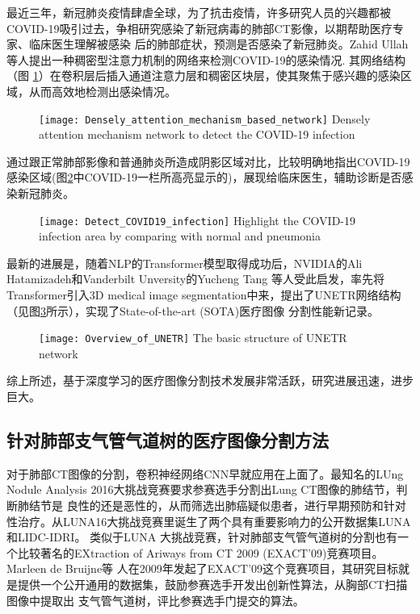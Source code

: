 	最近三年，新冠肺炎疫情肆虐全球，为了抗击疫情，许多研究人员的兴趣都被COVID-19吸引过去，争相研究感染了新冠病毒的肺部CT影像，以期帮助医疗专家、临床医生理解被感染
	后的肺部症状，预测是否感染了新冠肺炎。Zahid Ullah等人\cite{Ullah2023DenselyAM}提出一种稠密型注意力机制的网络来检测COVID-19的感染情况. 其网络结构（图
	\ref{fig:COVID19}）在卷积层后插入通道注意力层和稠密区块层，使其聚焦于感兴趣的感染区域，从而高效地检测出感染情况。
	\begin{figure}[!htp]
		\centering
		\texttt{[image: Densely\_attention\_mechanism\_based\_network]}
			{Densely attention mechanism network to detect the COVID-19 infection}
		\label{fig:COVID19}
	\end{figure}
	通过跟正常肺部影像和普通肺炎所造成阴影区域对比，比较明确地指出COVID-19感染区域(图\ref{fig:COVID19_detection}中COVID-19一栏所高亮显示的)，展现给临床医生，辅助诊断是否感染新冠肺炎。
	\begin{figure}[!htp]
		\centering
		\texttt{[image: Detect\_COVID19\_infection]}
			{Highlight the COVID-19 infection area by comparing with normal and pneumonia}
		\label{fig:COVID19_detection}
	\end{figure}
	
	最新的进展是，随着NLP的Transformer模型\cite{Devlin2019BERTPO, NIPS2017Attention}取得成功后，NVIDIA的Ali Hatamizadeh和Vanderbilt Unversity的Yucheng Tang
	等人\cite{unetr}受此启发，率先将Transformer引入3D medical image segmentation中来，提出了UNETR网络结构（见图\ref{fig:UNETR}所示），实现了State-of-the-art (SOTA)医疗图像
	分割性能新记录。
	\begin{figure}[!htp]
		\centering
		\texttt{[image: Overview\_of\_UNETR]}
			{The basic structure of UNETR network}
		\label{fig:UNETR}
	\end{figure}
	
	综上所述，基于深度学习的医疗图像分割技术发展非常活跃，研究进展迅速，进步巨大。
	
	
	
	\subsection{针对肺部支气管气道树的医疗图像分割方法}
	对于肺部CT图像的分割，卷积神经网络CNN早就应用在上面了。最知名的LUng Nodule Analysis 2016大挑战竞赛要求参赛选手分割出Lung CT图像的肺结节，判断肺结节是
	良性的还是恶性的，从而筛选出肺癌疑似患者，进行早期预防和针对性治疗。从LUNA16大挑战竞赛里诞生了两个具有重要影响力的公开数据集LUNA和LIDC-IDRI。 类似于LUNA
	大挑战竞赛，针对肺部支气管气道树的分割也有一个比较著名的EXtraction of Ariways from CT 2009 (EXACT'09)竞赛项目。Marleen de Bruijne等
	人\cite{Lo2012ExtractionOA}在2009年发起了EXACT'09这个竞赛项目，其研究目标就是提供一个公开通用的数据集，鼓励参赛选手开发出创新性算法，从胸部CT扫描图像中提取出
	支气管气道树，评比参赛选手门提交的算法。
	

